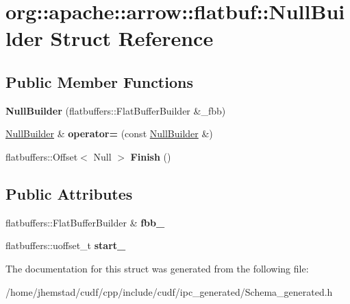 \hypertarget{structorg_1_1apache_1_1arrow_1_1flatbuf_1_1NullBuilder}{}\section{org\+:\+:apache\+:\+:arrow\+:\+:flatbuf\+:\+:Null\+Builder Struct Reference}
\label{structorg_1_1apache_1_1arrow_1_1flatbuf_1_1NullBuilder}
\subsection*{Public Member Functions}
\begin{DoxyCompactItemize}
\item 
{\bfseries Null\+Builder} (flatbuffers\+::\+Flat\+Buffer\+Builder \&\+\_\+fbb)\hypertarget{structorg_1_1apache_1_1arrow_1_1flatbuf_1_1NullBuilder_a32ef7fb5d26762a7a8e58f9a014618d3}{}\label{structorg_1_1apache_1_1arrow_1_1flatbuf_1_1NullBuilder_a32ef7fb5d26762a7a8e58f9a014618d3}

\item 
\hyperlink{structorg_1_1apache_1_1arrow_1_1flatbuf_1_1NullBuilder}{Null\+Builder} \& {\bfseries operator=} (const \hyperlink{structorg_1_1apache_1_1arrow_1_1flatbuf_1_1NullBuilder}{Null\+Builder} \&)\hypertarget{structorg_1_1apache_1_1arrow_1_1flatbuf_1_1NullBuilder_ab674b6f2dcd8df1be088e2ee72d9c5a8}{}\label{structorg_1_1apache_1_1arrow_1_1flatbuf_1_1NullBuilder_ab674b6f2dcd8df1be088e2ee72d9c5a8}

\item 
flatbuffers\+::\+Offset$<$ Null $>$ {\bfseries Finish} ()\hypertarget{structorg_1_1apache_1_1arrow_1_1flatbuf_1_1NullBuilder_af3008da4522ade55fe9e6162c843eb83}{}\label{structorg_1_1apache_1_1arrow_1_1flatbuf_1_1NullBuilder_af3008da4522ade55fe9e6162c843eb83}

\end{DoxyCompactItemize}
\subsection*{Public Attributes}
\begin{DoxyCompactItemize}
\item 
flatbuffers\+::\+Flat\+Buffer\+Builder \& {\bfseries fbb\+\_\+}\hypertarget{structorg_1_1apache_1_1arrow_1_1flatbuf_1_1NullBuilder_aea795f0e1bce064863e598e7b7bb7937}{}\label{structorg_1_1apache_1_1arrow_1_1flatbuf_1_1NullBuilder_aea795f0e1bce064863e598e7b7bb7937}

\item 
flatbuffers\+::uoffset\+\_\+t {\bfseries start\+\_\+}\hypertarget{structorg_1_1apache_1_1arrow_1_1flatbuf_1_1NullBuilder_a7eca95722be9b4edd5d8a6fbc66f5030}{}\label{structorg_1_1apache_1_1arrow_1_1flatbuf_1_1NullBuilder_a7eca95722be9b4edd5d8a6fbc66f5030}

\end{DoxyCompactItemize}


The documentation for this struct was generated from the following file\+:\begin{DoxyCompactItemize}
\item 
/home/jhemstad/cudf/cpp/include/cudf/ipc\+\_\+generated/Schema\+\_\+generated.\+h\end{DoxyCompactItemize}
